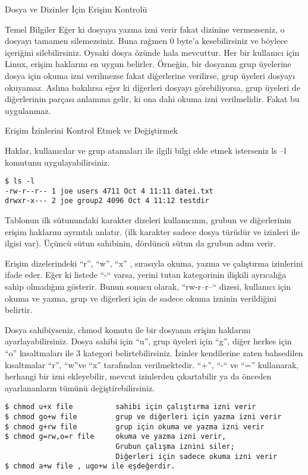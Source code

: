 \begin{section}{Dosya ve Dizinler İçin Erişim Kontrolü}
\begin{subsection}{Temel Bilgiler}
Eğer ki dosyaya yazma izni verir fakat dizinine vermezseniz, o dosyayı tamamen silemezsiniz. Buna rağmen 0 byte’a kesebilirsiniz ve böylece içeriğini silebilirsiniz. Oysaki dosya özünde hala mevcuttur. Her bir kullanıcı için Linux, erişim haklarını en uygun belirler. Örneğin, bir dosyanın grup üyelerine dosya için okuma izni verilmezse fakat diğerlerine verilirse, grup üyeleri dosyayı okuyamaz. Aslına bakılırsa eğer ki diğerleri dosyayı görebiliyorsa, grup üyeleri de diğerlerinin parçası anlamına gelir, ki ona dahi okuma izni verilmelidir. Fakat bu uygulanmaz.
\end{subsection}
\begin{subsection}{Erişim İzinlerini Kontrol Etmek ve Değiştirmek}

Haklar, kullanıcılar ve grup atamaları ile ilgili bilgi elde etmek isterseniz ls –l komutunu uygulayabilirsiniz.
\begin{verbatim}
$ ls -l
-rw-r--r-- 1 joe users 4711 Oct 4 11:11 datei.txt
drwxr-x--- 2 joe group2 4096 Oct 4 11:12 testdir
\end{verbatim}

Tablonun ilk sütunundaki karakter dizeleri kullanıcının, grubun ve diğerlerinin erişim haklarını ayrıntılı anlatır. (ilk karakter sadece dosya türüdür ve izinleri ile ilgisi var). Üçüncü sütun sahibinin, dördüncü sütun da grubun adını verir.

Erişim dizelerindeki “r”, “w”, “x” , sırasıyla okuma, yazma ve çalıştırma izinlerini ifade eder. Eğer ki listede “-“ varsa, yerini tutan kategorinin ilişkili ayrıcalığa sahip olmadığını gösterir. Bunun sonucu olarak, “rw-r--r--“ dizesi, kullanıcı için okuma ve yazma, grup ve diğerleri için de sadece okuma izninin verildiğini belirtir.

Dosya sahibiyseniz, chmod komutu ile bir dosyanın erişim haklarını ayarlayabilirsiniz. Dosya sahibi için “u”, grup üyeleri için “g”, diğer herkes için “o” kısaltmaları ile 3 kategori belirtebilirsiniz. İzinler kendilerine zaten bahsedilen kısaltmalar “r”, “w”ve “x” tarafından verilmektedir. “+”, “-“ ve “=” kullanarak, herhangi bir izni ekleyebilir, mevcut izinlerden çıkartabilir ya da önceden ayarlananların tümünü değiştirebilirsiniz.
\begin{verbatim}
$ chmod u+x file          sahibi için çalıştırma izni verir
$ chmod go+w file         grup ve diğerleri için yazma izni verir
$ chmod g+rw file         grup için okuma ve yazma izni verir
$ chmod g=rw,o=r file     okuma ve yazma izni verir,
                          Grubun çalışma iznini siler;
                          Diğerleri için sadece okuma izni verir
$ chmod a+w file , ugo+w ile eşdeğerdir.
\end{verbatim}


\end{subsection}
\end{section}
